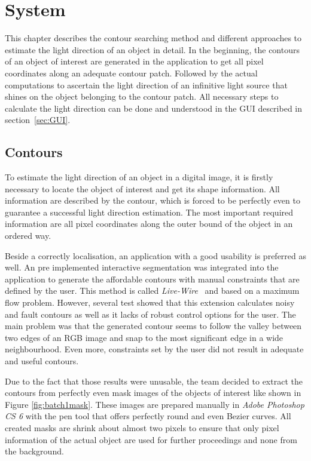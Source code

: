 \section{System}\label{sec:System}
This chapter describes the contour searching method and different approaches to estimate the light direction of an object in detail. In the beginning, the contours of an object of interest are generated in the application to get all pixel coordinates along an adequate contour patch. Followed by the actual computations to ascertain the light direction of an infinitive light source that shines on the object belonging to the contour patch. All necessary steps to calculate the light direction can be done and understood in the GUI described in section~\ref{sec:GUI}.

\subsection{Contours}\label{sec:contours}
To estimate the light direction of an object in a digital image, it is firstly necessary to locate the object of interest and get its shape information. All information are described by the contour, which is forced to be perfectly even to guarantee a successful light direction estimation. The most important required information are all pixel coordinates along the outer bound of the object in an ordered way.

Beside a correctly localisation, an application with a good usability is preferred as well. An pre implemented interactive segmentation \cite{website:LiveWire} was integrated into the application to generate the affordable contours with manual constraints that are defined by the user. This method is called \textit{Live-Wire}~\cite{BARRETT1997331} and based on a maximum flow problem. However, several test showed that this extension calculates noisy and fault contours as well as it lacks of robust control options for the user. The main problem was that the generated contour seems to follow the valley between two edges of an RGB image and snap to the most significant edge in a wide neighbourhood. Even more, constraints set by the user did not result in adequate and useful contours. 

Due to the fact that those results were unusable, the team decided to extract the contours from perfectly even mask images of the objects of interest like shown in Figure \ref{fig:batch1mask}. These images are prepared manually in \textit{Adobe Photoshop CS 6} with the pen tool that offers perfectly round and even Bezier curves. All created masks are shrink about almost two pixels to ensure that only pixel information of the actual object are used for further proceedings and none from the background. 

